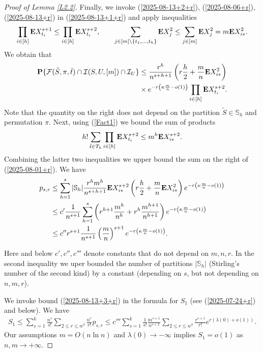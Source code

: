 \documentclass[11pt, a4paper]{article}
\newcommand{\E}{{\bf{E}}}
\newcommand{\PP}{{\bf{P}}}
\begin{document}
\begin{proof}[Proof of Lemma \ref{L2.2}]
Finally, we invoke (\ref{2025-08-13+2+r}), (\ref{2025-08-06+r}),  
(\ref{2025-08-13+r}) in (\ref{2025-08-13+1+r})
and apply inequalities
\begin{align*}
\prod_{i\in[h]}\E X_{t_i}^{s+1}
\le 
\prod_{i\in[h]}\E X_{t_i}^{s+2},
\qquad
\sum_{j\in [m]\setminus\{t_1,\dots, t_h\}}\E X_j^2
\le\sum_{j\in[m]}\E X_j^2
=
m\E X_{i*}^2.
\end{align*}
We obtain that 
\begin{align*}
\PP\{{\cal F}({\tilde S}, \pi, {\tilde t})\cap {\cal I}(S,U,[m])
\cap
{\cal I}_U\}
&
\le
\frac{r^h}{n^{s+h+1}}
\left(
r\frac{h}{2}+\frac{m}{n}\E X_{i*}^2
\right)
\\
&
\times
e^{-r\left(\kappa\frac{m}{n}-o(1)\right)}
\prod_{i\in[h]}\E X_{t_i}^{s+2}.
\end{align*}
Note that the  quantity on the right
does not depend on the partition 
${\tilde S}\in {\mathbb S}_h$
and permutation $\pi$. 
Next, using   (\ref{Fact1})
we bound the sum of products 
\begin{align*}
h!\sum_{{\tilde t}\in T_h}\prod_{i\in[h]}\E X_{t_i}^{s+2}
\le 
m^h\E X_{i*}^{s+2}.
\end{align*}
Combining the latter two inequalities we upper bound the sum on the right of 
 (\ref{2025-08-01+r}). We have
\begin{align}
\nonumber
p_{s,r}
&
\le
\sum_{h=1}^s
|{\mathbb S}_h|
\frac{r^hm^h}{n^{s+h+1}}\E X_{i*}^{s+2}
\left(
r\frac{h}{2}+\frac{m}{n}\E X_{i*}^2
\right)
e^{-r\left(\kappa\frac{m}{n}-o(1)\right)}
\\
\nonumber
&
\le
c'
\frac{1}{n^{s+1}}\sum_{h=1}^s\left(r^{h+1}\frac{m^h}{n^h}
+
r^h\frac{m^{h+1}}{n^{h+1}}\right)
e^{-r\left(\kappa\frac{m}{n}-o(1)\right)}
\\
\label{2025-08-13+3+r}
&
\le
c''r^{s+1}
\frac{1}{n^{s+1}}
\left(\frac{m}{n}\right)^{s+1}
e^{-r\left(\kappa\frac{m}{n}-o(1)\right)}.
\end{align}

Here and below $c', c'', c'''$ denote constants that do not depend on $m,n,r$.
In the second inequality we uper bounded   the number of partitions
$|{\mathbb S}_h|$
 (Stirling's number of the second kind)     by  a constant (depending on $s$, but not depending on $n,m,r$). 

We invoke bound (\ref{2025-08-13+3+r}) in the formula for $S_1$ (see (\ref{2025-07-24+r}) and below). We have
\begin{align*}
S_1
\le
\sum_{s=1}^{k}\frac{n^s}{s!}
\sum_{2\le r\le n^{\beta}}
\frac{n^r}{r!}p_{s,r}
\le
c'''
\sum_{s=1}^{k}
\frac{1}{s!}\frac{m^{s+1}}{n^{s+2}}
\sum_{2\le r\le n^{\beta}}
\frac{r^{s+1}}{r!}
e^{r\left(\lambda(0)+o(1)\right)}.
\end{align*}
 Our assumptions $m=O(n\ln n)$ and $\lambda(0)\to-\infty$ implies 
 $S_1=o(1)$ as $n,m\to+\infty$.
 

\end{proof}
\end{document}
